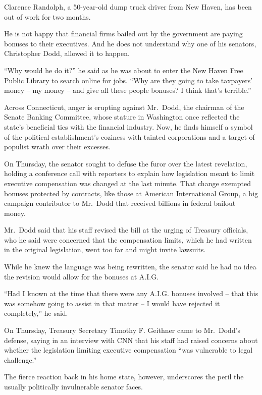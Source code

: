 \documentclass[12pt,a4paper,onecolumn]{article}
\begin{document}
\begin{CJK*}{GBK}{song}
Clarence Randolph, a 50-year-old dump truck driver from New Haven, has been out of work for two
months.

He is not happy that financial firms bailed out by the government are paying bonuses to their
executives. And he does not understand why one of his senators, Christopher Dodd, allowed it to
happen.

``Why would he do it?'' he said as he was about to enter the New Haven Free Public Library to search
online for jobs. ``Why are they going to take taxpayers' money -- my money -- and give all these
people bonuses? I think that's terrible.''

Across Connecticut, anger is erupting against Mr.~Dodd, the chairman of the Senate Banking
Committee, whose stature in Washington once reflected the state's beneficial ties with the financial
industry. Now, he finds himself a symbol of the political establishment's coziness with tainted
corporations and a target of populist wrath over their excesses.

On Thursday, the senator sought to defuse the furor over the latest revelation, holding a conference
call with reporters to explain how legislation meant to limit executive compensation was changed at
the last minute. That change exempted bonuses protected by contracts, like those at American
International Group, a big campaign contributor to Mr.~Dodd that received billions in federal
bailout money.

Mr.~Dodd said that his staff revised the bill at the urging of Treasury officials, who he said were
concerned that the compensation limits, which he had written in the original legislation, went too
far and might invite lawsuits.

While he knew the language was being rewritten, the senator said he had no idea the revision would
allow for the bonuses at A.I.G.

``Had I known at the time that there were any A.I.G. bonuses involved -- that this was somehow going
to assist in that matter -- I would have rejected it completely,'' he said.

On Thursday, Treasury Secretary Timothy F. Geithner came to Mr.~Dodd's defense, saying in an
interview with CNN that his staff had raised concerns about whether the legislation limiting
executive compensation ``was vulnerable to legal challenge.''

The fierce reaction back in his home state, however, underscores the peril the usually politically
invulnerable senator faces.


\end{CJK*}
\end{document}
